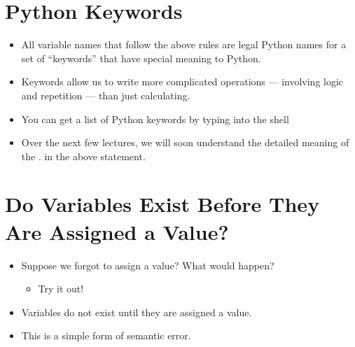 \documentclass[letterpaper,10pt,english]{sphinxmanual}
\begin{document}
\section{Python Keywords}
\label{\detokenize{lecture_notes/lec02_calculator:python-keywords}}\begin{itemize}
\item {} 
All variable names that follow the above rules are legal Python
names  for a set of “keywords” that have special
meaning to Python.

\item {} 
Keywords allow us to write more complicated operations
— involving logic and repetition — than just calculating.

\item {} 
You can get a list of Python keywords by typing into the shell

%
\begin{sphinxVerbatim}[commandchars=\\\{\}]
 
\end{sphinxVerbatim}

\item {} 
Over the next few lectures, we will soon understand the detailed
meaning of the . in the above statement.

\end{itemize}


\section{Do Variables Exist Before They Are Assigned a Value?}
\label{\detokenize{lecture_notes/lec02_calculator:do-variables-exist-before-they-are-assigned-a-value}}\begin{itemize}
\item {} 
Suppose we forgot to assign  a value? What would happen?
\begin{itemize}
\item {} 
Try it out!

\end{itemize}

\item {} 
Variables do not exist until they are assigned a value.

\item {} 
This is a simple form of semantic error.

\end{itemize}
\end{document}
